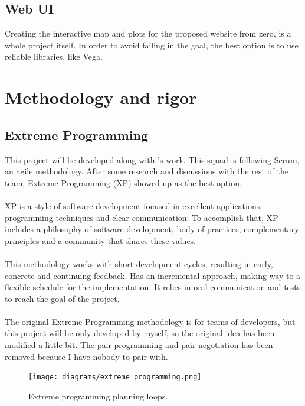 \subsection{Web UI}

Creating the interactive map and plots for the proposed website from zero, is a whole project itself. In order to avoid failing in the \textit{} goal, the best option is to use reliable libraries, like Vega\cite{vega}.


\section{Methodology and rigor}

\subsection{Extreme Programming}

This project will be developed along with \squad's work. This squad is following Scrum, an agile methodology. After some research and discussions with the rest of the team, Extreme Programming (XP)\cite{xp} showed up as the best option.
\\\\
XP is a style of software development focused in excellent applications, programming techniques and clear communication. To accomplish that, XP includes a philosophy of software development, body of practices, complementary principles and a community that shares these values.
\\\\
This methodology works with short development cycles, resulting in early, concrete and continuing feedback. Has an incremental approach, making way to a flexible schedule for the implementation. It relies in oral communication and tests to reach the goal of the project.
\\\\
The original Extreme Programming methodology is for teams of developers, but this project will be only developed by myself, so the original idea has been modified a little bit. The pair programming and pair negotiation has been removed because I have nobody to pair with.

\begin{figure}[H]
\centering
\texttt{[image: diagrams/extreme\_programming.png]}
\caption{Extreme programming planning loops.}
\end{figure}

